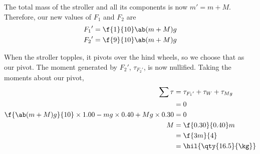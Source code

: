The total mass of the stroller and all its components is now \(m' = m + M\).
Therefore, our new values of \(F_1\) and \(F_2\) are
\begin{align*}
  {F_1}' &= \f{1}{10}\ab(m+M)g\\
  {F_2}' &= \f{9}{10}\ab(m+M)g
\end{align*}

When the stroller topples, it pivots over the hind wheels, so we
choose that as our pivot.
The moment generated by \({F_2}'\), \(\tau_{{F_2}'}\), is now nullified.
Taking the moments about our pivot,
\begin{align*}
  \sum\tau &= \tau_{{F_1}'} + \tau_{W} + \tau_{Mg} \\
  &= 0\\
  \f{\ab(m+M)g}{10}\times 1.00 - mg \times 0.40 + Mg
  \times 0.30
  &= 0 \\
  M&=\f{0.30}{0.40}m\\
  &=\f{3m}{4} \\
  &= \hil{\qty{16.5}{\kg}}
\end{align*}

